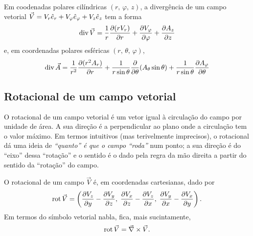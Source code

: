 Em coodenadas polares cilíndricas $(r,\,\varphi,\,z)$, a divergência de um campo
vetorial $\vec V=V_r\he_r+V_\varphi\he_\varphi+V_z\he_z$ tem a forma
\begin{equation}
\div\vec V=\frac{1}{r}\pd{(rV_r)}{r}+\pd{V_\varphi}{\varphi}+\pd{A_z}{z}
\end{equation}
e, em coordenadas polares esféricas $(r,\,\theta,\,\varphi)$, 
\begin{equation}
\div \vec A=\frac{1}{r^2}\pd{(r^2A_r)}{r}+
    \frac{1}{r\sin\theta}\pd{}{\theta}(A_\theta\sin\theta)+
    \frac{1}{r\sin\theta}\pd{A_\varphi}{\theta}
\end{equation}

\subsection*{Rotacional de um campo vetorial}
O rotacional de um campo vetorial é um vetor igual à circulação do campo por
unidade de área. A sua direção é a perpendicular ao plano onde a circulação tem
o valor máximo. Em termos intuitivos (mas terivelmente imprecisos), o rotacional
dá uma ideia de \emph{``quanto'' é que o campo ``roda''} num ponto; a sua
direção é do ``eixo'' dessa ``rotação'' e o sentido é o dado pela regra da mão
direita a partir do sentido da ``rotação'' do campo. 

O rotacional de um campo $\vec V$ é, em coordenadas cartesianas, dado por
\begin{equation}\label{eq:rotcart}
  \rot\vec V=
  \left(\pd{V_z}{y}-\pd{V_y}{z},\; \pd{V_x}{z}-\pd{V_z}{x},\;
  \pd{V_y}{x}-\pd{V_x}{y}\right).
\end{equation}
Em termos do símbolo vetorial nabla, fica, mais sucintamente,
\begin{equation}
  \rot\vec V=\vec\nabla\times\vec V.
\end{equation}


